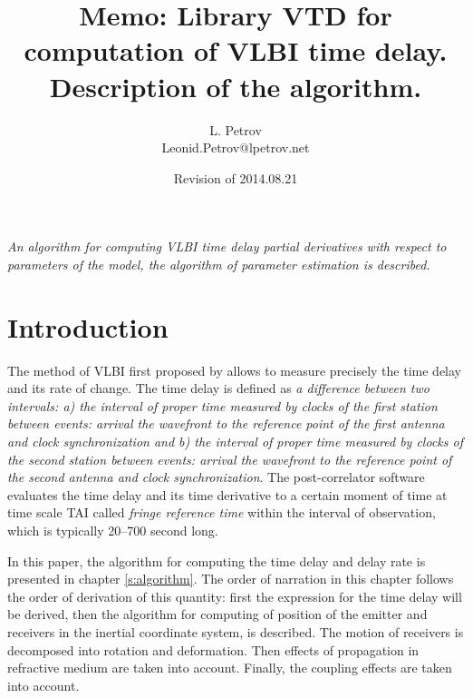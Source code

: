 \title {  \LARGE\bf Memo: Library VTD for computation of VLBI time delay.
                          Description of the algorithm. }
\author{ {\large\sc L. Petrov} \\
         {\small Leonid.Petrov@lpetrov.net }
       }
\date{Revision of 2014.08.21}




\maketitle

\hspace{0.05\textwidth}
\begin{minipage}{0.82\textwidth}
\small\it
   An algorithm for computing VLBI time delay partial derivatives with
respect to parameters of the model, the algorithm of parameter estimation
is described.
\end{minipage}\par\bigskip\bigskip\par

\section{Introduction}

  The method of VLBI first proposed by \cite{r:mat65}  allows to measure
precisely the time delay and its rate of change. The time delay is defined
as {\it a difference between two intervals: a) the interval of proper time
measured by clocks of the first station between events: arrival the wavefront
to the reference point of the first antenna and clock synchronization and
b) the interval of proper time measured by clocks of the second station
between events: arrival the wavefront to the reference point of the second
antenna and clock synchronization}. The post-correlator software evaluates
the time delay and its time derivative to a certain moment of time at time
scale TAI called {\it fringe reference time} within the interval of
observation, which is typically 20--700 second long.

  In this paper, the algorithm for computing the time delay and delay rate
is presented in chapter \ref{s:algorithm}. The order of narration in this
chapter follows the order of derivation of this quantity: first the
expression for the time delay will be derived, then the algorithm for computing
of position of the emitter and receivers in the inertial coordinate system,
is described. The motion of receivers is decomposed into rotation and
deformation. Then effects of propagation in refractive medium are taken into
account. Finally, the coupling effects are taken into account.

